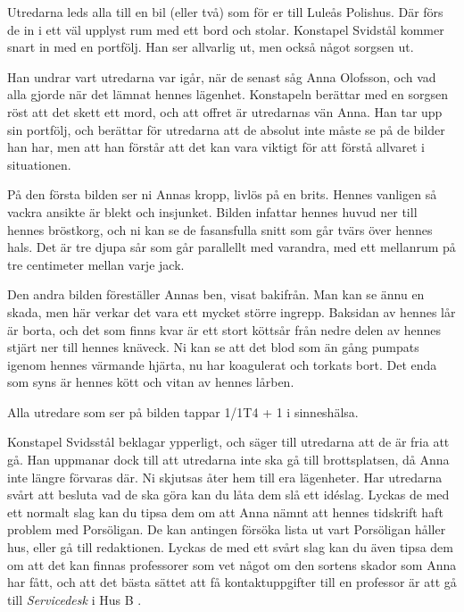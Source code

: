 Utredarna leds alla till en bil (eller två) som för er till Luleås Polishus. Där förs de in i ett väl upplyst rum med ett bord och stolar. Konstapel Svidstål kommer snart in med en portfölj. Han ser allvarlig ut, men också något sorgsen ut.

Han undrar vart utredarna var igår, när de senast såg Anna Olofsson, och vad alla gjorde när det lämnat hennes lägenhet. Konstapeln berättar med en sorgsen röst att det skett ett mord, och att offret är utredarnas vän Anna. Han tar upp sin portfölj, och berättar för utredarna att de absolut inte måste se på de bilder han har, men att han förstår att det kan vara viktigt för att förstå allvaret i situationen.

\begin{displayquote}
	På den första bilden ser ni Annas kropp, livlös på en brits. Hennes vanligen så vackra ansikte är blekt och insjunket. Bilden infattar hennes huvud ner till hennes bröstkorg, och ni kan se de fasansfulla snitt som går tvärs över hennes hals. Det är tre djupa sår som går parallellt med varandra, med ett mellanrum på tre centimeter mellan varje jack.

	Den andra bilden föreställer Annas ben, visat bakifrån. Man kan se ännu en skada, men här verkar det vara ett mycket större ingrepp. Baksidan av hennes lår är borta, och det som finns kvar är ett stort köttsår från nedre delen av hennes stjärt ner till hennes knäveck. Ni kan se att det blod som än gång pumpats igenom hennes värmande hjärta, nu har koagulerat och torkats bort. Det enda som syns är hennes kött och vitan av hennes lårben.
\end{displayquote}
%
Alla utredare som ser på bilden tappar 1/1T4 + 1 i sinneshälsa. 

Konstapel Svidsstål beklagar ypperligt, och säger till utredarna att de är fria att gå. Han uppmanar dock till att utredarna inte ska gå till brottsplatsen, då Anna inte längre förvaras där. Ni skjutsas åter hem till era lägenheter. Har utredarna svårt att besluta vad de ska göra kan du låta dem slå ett idéslag. Lyckas de med ett normalt slag kan du tipsa dem om att Anna nämnt att hennes tidskrift haft problem med Porsöligan. De kan antingen försöka lista ut vart Porsöligan håller hus, eller gå till redaktionen. Lyckas de med ett svårt slag kan du även tipsa dem om att det kan finnas professorer som vet något om den sortens skador som Anna har fått, och att det bästa sättet att få kontaktuppgifter till en professor är att gå till \textit{Servicedesk} i Hus B \sectiondescribe{\ref{loc:Servicedesk}}.
